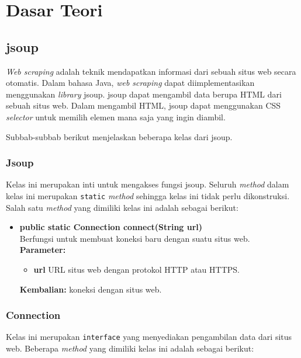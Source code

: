 \chapter{Dasar Teori}
\label{chap:Dasar Teori}

\section{jsoup}
\label{sec:jsoup}

\textit{Web scraping} adalah teknik mendapatkan informasi dari sebuah situs web secara otomatis\cite{Vargiu:2013}. Dalam bahasa Java, \textit{web scraping} dapat diimplementasikan menggunakan \textit{library} jsoup\cite{jsoup}. jsoup dapat mengambil data berupa HTML dari sebuah situs web. Dalam mengambil HTML, jsoup dapat menggunakan CSS \textit{selector} untuk memilih elemen mana saja yang ingin diambil. 

Subbab-subbab berikut menjelaskan beberapa kelas dari jsoup.

\subsection{Jsoup}

Kelas ini merupakan inti untuk mengakses fungsi jsoup. Seluruh \textit{method} dalam kelas ini merupakan \texttt{static} \textit{method} sehingga kelas ini tidak perlu dikonstruksi. Salah satu \textit{method} yang dimiliki kelas ini adalah sebagai berikut:
\begin{itemize}
	\item \textbf{public static Connection connect(String url)} \\
		Berfungsi untuk membuat koneksi baru dengan suatu situs web. \\
		\textbf{Parameter:}
		\begin{itemize}
			\item \textbf{url} URL situs web dengan protokol HTTP atau HTTPS.
		\end{itemize}
		\textbf{Kembalian:} koneksi dengan situs web.
\end{itemize}

\subsection{Connection}

Kelas ini merupakan \texttt{interface} yang menyediakan pengambilan data dari situs web. Beberapa \textit{method} yang dimiliki kelas ini adalah sebagai berikut:

